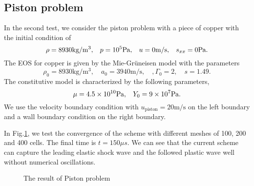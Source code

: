 \documentclass[review]{elsarticle}
\begin{document}
\subsection{Piston problem}
In the second test, we consider the  piston problem \cite{maire2007cell} with a piece of copper with the initial condition of
\begin{equation}
  \rho = 8930 \text{kg}/\text{m}^3, \hspace{0.3cm}  p = 10^5 \text{Pa}, \hspace{0.3cm}  u = 0 \text{m}/\text{s},\hspace{0.3cm}  s_{xx} = 0 \text{Pa}.
\end{equation}
The EOS for copper is given by  the Mie-Gr\"uneisen model with the parameters
\begin{equation}
  \rho_0 = 8930 \text{kg}/\text{m}^3, \quad a_0 = 3940\text{m}/\text{s}, \quad , \Gamma_0 = 2, \quad  s = 1.49.
\end{equation}
The constitutive model is characterized by the following parameters,
\begin{equation}
  \mu = 4.5\times 10^{10}\text{Pa}, \hspace{0.3cm} Y_0 = 9\times 10^7 \text{Pa}.
\end{equation}
We use the velocity boundary condition with $u_{\text{piston}} = 20 \text{m}/\text{s}$ on the left boundary  and a  wall boundary condition on the right boundary.

In Fig.\ref{fig:piston1}, we test the convergence of the scheme with different meshes of 100, 200 and 400 cells. The final time is $t = 150 \mu s $.  We can  see that the current scheme can capture the leading elastic shock wave and the followed plastic wave well without numerical oscillations.
\begin{figure}
      \caption{ The result of Piston problem}
      \label{fig:piston1}
    \end{figure}
\end{document}
